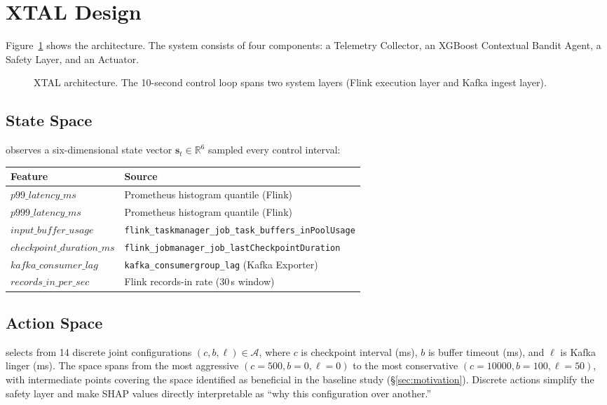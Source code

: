 \section{XTAL Design}
\label{sec:design}

Figure~\ref{fig:arch} shows the \xtal architecture.
The system consists of four components: a Telemetry Collector, an
XGBoost Contextual Bandit Agent, a Safety Layer, and an Actuator.

\begin{figure}[t]
  \centering
  \caption{XTAL architecture. The 10-second control loop spans two system
    layers (Flink execution layer and Kafka ingest layer).}
  \label{fig:arch}
\end{figure}

\subsection{State Space}
\xtal observes a six-dimensional state vector $\mathbf{s}_t \in \mathbb{R}^6$
sampled every control interval:

\begin{center}
\small
\begin{tabular}{ll}
\toprule
Feature & Source \\
\midrule
$p99\_latency\_ms$ & Prometheus histogram quantile (Flink) \\
$p999\_latency\_ms$ & Prometheus histogram quantile (Flink) \\
$input\_buffer\_usage$ & \texttt{flink\_taskmanager\_job\_task\_buffers\_inPoolUsage} \\
$checkpoint\_duration\_ms$ & \texttt{flink\_jobmanager\_job\_lastCheckpointDuration} \\
$kafka\_consumer\_lag$ & \texttt{kafka\_consumergroup\_lag} (Kafka Exporter) \\
$records\_in\_per\_sec$ & Flink records-in rate (30\,s window) \\
\bottomrule
\end{tabular}
\end{center}

\subsection{Action Space}
\xtal selects from 14 discrete joint configurations
$(c, b, \ell) \in \mathcal{A}$, where $c$ is checkpoint interval (ms),
$b$ is buffer timeout (ms), and $\ell$ is Kafka linger (ms).
The space spans from the most aggressive
$(c=500, b=0, \ell=0)$ to the most conservative
$(c=10000, b=100, \ell=50)$, with intermediate points covering the
space identified as beneficial in the baseline study (\S\ref{sec:motivation}).
Discrete actions simplify the safety layer and make SHAP values directly
interpretable as ``why this configuration over another.''


